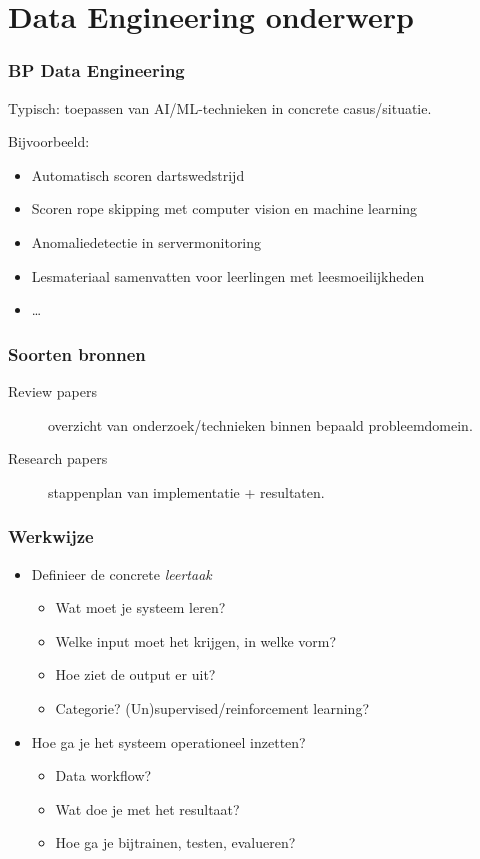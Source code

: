 \documentclass[aspectratio=169]{beamer}
\begin{document}
\section{Data Engineering onderwerp}

\begin{frame}
  \frametitle{BP Data Engineering}

  Typisch: toepassen van AI/ML-technieken in concrete casus/situatie.
  
  \bigskip

  Bijvoorbeeld:

  \begin{itemize}
    \item Automatisch scoren dartswedstrijd
    \item Scoren rope skipping met computer vision en machine learning
    \item Anomaliedetectie in servermonitoring
    \item Lesmateriaal samenvatten voor leerlingen met leesmoeilijkheden
    \item \ldots
  \end{itemize}

\end{frame}

\begin{frame}
  \frametitle{Soorten bronnen}

  \begin{description}
    \item[Review papers] overzicht van onderzoek/technieken binnen bepaald probleemdomein.
    \item[Research papers] stappenplan van implementatie + resultaten.
  \end{description}

\end{frame}

\begin{frame}[plain]
  \frametitle{Werkwijze}

  \begin{itemize}
    \item Definieer de concrete \textit{leertaak}
    \begin{itemize}
      \item Wat moet je systeem leren?
      \item Welke input moet het krijgen, in welke vorm?
      \item Hoe ziet de output er uit?
      \item Categorie? (Un)supervised/reinforcement learning?
    \end{itemize}
    \item Hoe ga je het systeem operationeel inzetten?
    \begin{itemize}
      \item Data workflow?
      \item Wat doe je met het resultaat?
      \item Hoe ga je bijtrainen, testen, evalueren?
    \end{itemize}
  \end{itemize}
\end{frame}
\end{document}
